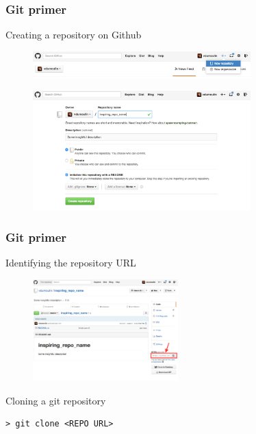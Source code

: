 \documentclass[mathserif, xcolor=dvipsnames]{beamer}
\begin{document}
\begin{frame}
    \frametitle{Git primer}
    \begin{block}{Creating a repository on Github}
    \begin{figure}[H]
        \includegraphics[width=0.75\textwidth]{repo_creation_1.png}
    \end{figure}
    \begin{figure}[H]
        \includegraphics[width=0.75\textwidth]{repo_creation_2.png}
    \end{figure}
    \end{block}
\end{frame}

\begin{frame}[fragile]
    \frametitle{Git primer}

    \begin{block}{Identifying the repository URL}
    \begin{figure}[H]
        \includegraphics[width=0.5\textwidth]{repo_cloning.png}
    \end{figure}
    \end{block}

    \begin{block}{Cloning a git repository}
\begin{lstlisting}
> git clone <REPO URL>
\end{lstlisting}
    \end{block}
\end{frame}
\end{document}
